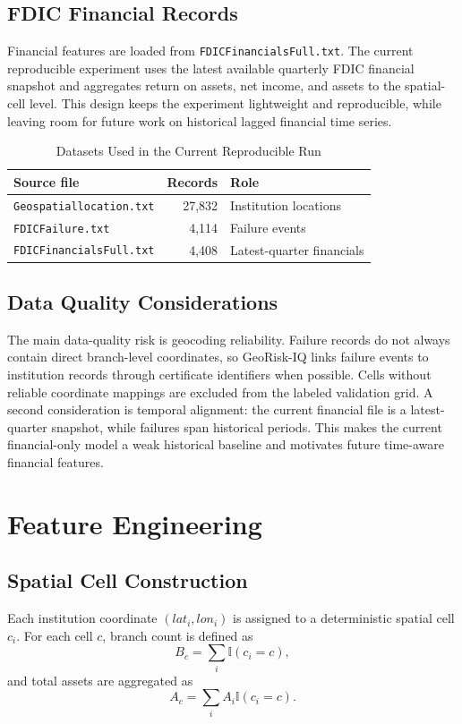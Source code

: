 \documentclass[conference]{IEEEtran}
\begin{document}
\subsection{FDIC Financial Records}
Financial features are loaded from \texttt{FDICFinancialsFull.txt}. The
current reproducible experiment uses the latest available quarterly FDIC
financial snapshot and aggregates return on assets, net income, and assets
to the spatial-cell level. This design keeps the experiment lightweight and
reproducible, while leaving room for future work on historical lagged
financial time series.

\begin{table}[t]
\caption{Datasets Used in the Current Reproducible Run}
\label{tab:data_summary}
\centering
\begin{tabular}{lrl}
\toprule
Source file & Records & Role \\
\midrule
\texttt{Geospatiallocation.txt} & 27,832 & Institution locations \\
\texttt{FDICFailure.txt} & 4,114 & Failure events \\
\texttt{FDICFinancialsFull.txt} & 4,408 & Latest-quarter financials \\
\bottomrule
\end{tabular}
\end{table}

\subsection{Data Quality Considerations}
The main data-quality risk is geocoding reliability. Failure records do not
always contain direct branch-level coordinates, so GeoRisk-IQ links failure
events to institution records through certificate identifiers when possible.
Cells without reliable coordinate mappings are excluded from the labeled
validation grid. A second consideration is temporal alignment: the current
financial file is a latest-quarter snapshot, while failures span historical
periods. This makes the current financial-only model a weak historical
baseline and motivates future time-aware financial features.

\section{Feature Engineering}
\subsection{Spatial Cell Construction}
Each institution coordinate $(lat_i, lon_i)$ is assigned to a deterministic
spatial cell $c_i$. For each cell $c$, branch count is defined as
\begin{equation}
    B_c = \sum_i \mathbb{I}(c_i = c),
\end{equation}
and total assets are aggregated as
\begin{equation}
    A_c = \sum_i A_i \mathbb{I}(c_i = c).
\end{equation}
\end{document}
